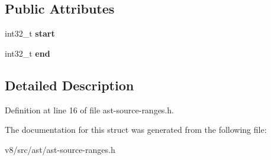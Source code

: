 \subsection*{Public Attributes}
\begin{DoxyCompactItemize}
\item 
\mbox{\label{structv8_1_1internal_1_1SourceRange_a9fc2056310f6b4ef624b9f2aac935ec6}} 
int32\+\_\+t {\bfseries start}
\item 
\mbox{\label{structv8_1_1internal_1_1SourceRange_a301f76f2aaa5de47c5c3c1af3b984c2a}} 
int32\+\_\+t {\bfseries end}
\end{DoxyCompactItemize}


\subsection{Detailed Description}


Definition at line 16 of file ast-\/source-\/ranges.\+h.



The documentation for this struct was generated from the following file\+:\begin{DoxyCompactItemize}
\item 
v8/src/ast/ast-\/source-\/ranges.\+h\end{DoxyCompactItemize}
